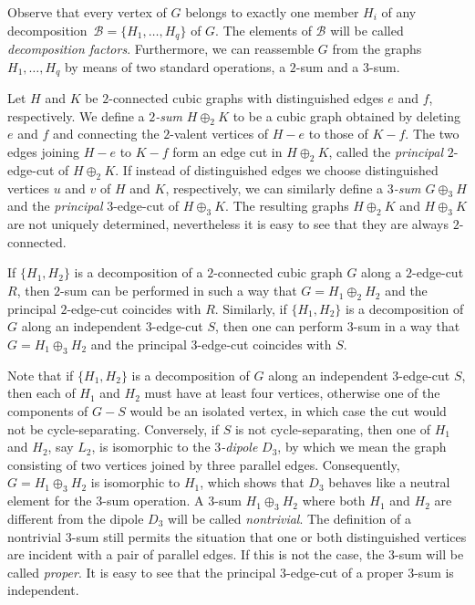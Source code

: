 \documentclass[a4paper]{amsart}
\theoremstyle{plain}
\theoremstyle{definition}
\begin{document}
Observe that every vertex of $G$ belongs to exactly one member
$H_i$ of any decomposition~$\mathcal{B}=\{H_1,\ldots,H_q\}$ of
$G$. The elements of $\mathcal{B}$ will be called
\emph{decomposition factors}. Furthermore, we can reassemble
$G$ from the graphs $H_1, \ldots, H_q$ by means of two standard
operations, a $2$-sum and a $3$-sum.

Let $H$ and $K$ be $2$-connected cubic graphs with
distinguished edges $e$ and $f$, respectively. We define a
\emph{$2$-sum}\emph{ $H\oplus_2 K$} to be a cubic graph
obtained by deleting $e$ and $f$ and connecting the $2$-valent
vertices of $H-e$ to those of $K-f$. The two edges joining
$H-e$ to $K-f$ form an edge cut in $H\oplus_2 K$, called the
\emph{principal} $2$-edge-cut of $H\oplus_2 K$. If instead of
distinguished edges we choose distinguished vertices $u$ and
$v$ of $H$ and $K$, respectively, we can similarly define a
\emph{$3$-sum $G\oplus_3 H$} and the \emph{principal}
$3$-edge-cut of $H\oplus_3 K$. The resulting graphs
$H\oplus_2 K$ and $H\oplus_3 K$ are not uniquely determined,
nevertheless it is easy to see that they are always
$2$-connected.

If $\{H_1,H_2\}$ is a decomposition of a $2$-connected cubic
graph $G$ along a $2$-edge-cut $R$, then $2$-sum can be
performed in such a way that $G=H_1\oplus_2 H_2$ and the
principal $2$-edge-cut coincides with $R$. Similarly, if
$\{H_1,H_2\}$ is a decomposition of $G$ along an independent
$3$-edge-cut $S$, then one can perform $3$-sum in a way that
$G=H_1\oplus_3 H_2$ and the principal $3$-edge-cut coincides
with $S$.

Note that if $\{H_1,H_2\}$ is a decomposition of $G$ along an
independent $3$-edge-cut $S$, then each of $H_1$ and $H_2$ must
have at least four vertices, otherwise one of the components of
$G-S$ would be an isolated vertex, in which case the cut would
not be cycle-separating. Conversely, if $S$ is not
cycle-separating, then one of $H_1$ and $H_2$, say $L_2$, is
isomorphic to the \emph{$3$-dipole} $D_3$, by which we mean the
graph consisting of two vertices joined by three parallel
edges. Consequently, $G=H_1\oplus_3 H_2$ is isomorphic to
$H_1$, which shows that $D_3$ behaves like a neutral element
for the $3$-sum operation. A $3$-sum $H_1\oplus_3 H_2$ where
both $H_1$ and $H_2$ are different from the dipole $D_3$ will
be called \emph{nontrivial}. The definition of a nontrivial
$3$-sum still permits the situation that one or both
distinguished vertices are incident with a pair of parallel
edges. If this is not the case, the $3$-sum will be called
\emph{proper}. It is easy to see that the principal
$3$-edge-cut of a proper $3$-sum is independent.
\end{document}

